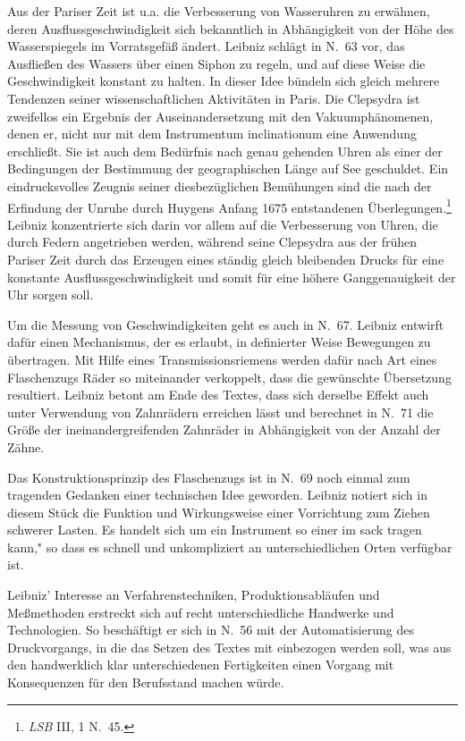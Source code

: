 Aus der Pariser Zeit ist u.a. die Verbesserung von Wasseruhren zu erw\"{a}hnen, deren Ausflussgeschwindigkeit sich bekanntlich in Abh\"{a}ngigkeit von der H\"{o}he des Wasserspiegels im Vorratsgef\"{a}{\ss} \"{a}ndert. Leibniz schl\"{a}gt in N.~63 vor, das Ausflie{\ss}en des Wassers \"{u}ber einen Siphon zu regeln, und auf diese Weise die Geschwindigkeit konstant zu halten. In dieser Idee b\"{u}ndeln sich gleich mehrere Tendenzen seiner wissenschaftlichen Aktivit\"{a}ten in Paris. Die Clepsydra ist zweifellos ein Ergebnis der Auseinandersetzung mit den Vakuumph\"{a}nomenen, denen er, nicht nur mit dem Instrumentum inclinationum eine Anwendung erschlie{\ss}t. Sie ist auch dem Bed\"{u}rfnis nach genau gehenden Uhren als einer der Bedingungen der Bestimmung der geographischen L\"{a}nge auf See geschuldet. Ein ein\-drucks\-volles Zeugnis seiner diesbez\"{u}glichen Bem\"{u}hungen sind die nach der Erfindung der Unruhe durch Huygens Anfang 1675 entstandenen \"{U}berlegungen.\footnote{\footnotesize\textit{LSB} III, 1 N.~45.} Leibniz konzentrierte sich darin vor allem auf die Verbesserung von Uhren, die durch Federn angetrieben werden, w\"{a}hrend seine Clepsydra aus der fr\"{u}hen Pariser Zeit durch das Erzeugen eines st\"{a}ndig gleich bleibenden Drucks f\"{u}r eine konstante Aus\-flussgeschwindigkeit und somit f\"{u}r eine h\"{o}here Ganggenauigkeit der Uhr sorgen soll.\par
Um die Messung von Geschwindigkeiten geht es auch in N.~67. Leibniz ent\-wirft daf\"{u}r einen Mechanismus, der es erlaubt, in definierter Weise Bewegungen zu \"{u}bertragen. Mit Hilfe eines Transmissionsriemens werden daf\"{u}r nach Art eines Flaschenzugs R\"{a}der so miteinander verkoppelt, dass die gew\"{u}nschte \"{U}bersetzung resultiert. Leibniz betont am Ende des Textes, dass sich derselbe Effekt auch unter Verwendung von Zahnr\"{a}dern erreichen l\"{a}sst und berechnet in N.~71 die Gr\"{o}{\ss}e der ineinandergreifenden Zahnr\"{a}der in Abh\"{a}ngigkeit von der Anzahl der Z\"{a}hne.\par
Das Konstruktionsprinzip des Flaschenzugs ist in N.~69 noch einmal zum tragenden Gedanken einer technischen Idee geworden. Leibniz notiert sich in diesem St\"{u}ck die Funktion und Wirkungsweise einer Vorrichtung zum Ziehen schwerer Lasten. Es handelt sich um ein Instrument so einer im sack tragen kann," so dass es schnell und unkompliziert an unterschiedlichen Orten verf\"{u}gbar ist.\par
Leibniz' Interesse an Verfahrenstechniken, Produktionsabl\"{a}ufen und Me{\ss}methoden erstreckt sich auf recht unterschiedliche Handwerke und Technologien. So besch\"{a}ftigt er sich in N.~56 mit der Automatisierung des Druckvorgangs, in die das Setzen des Textes mit einbezogen werden soll, was aus den handwerklich klar unterschiedenen Fertigkeiten einen Vorgang mit Konsequenzen f\"{u}r den Berufsstand machen w\"{u}rde.\par
